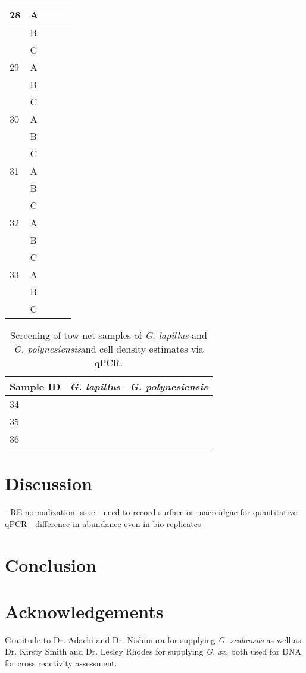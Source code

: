 \documentclass[12pt]{article}
\begin{document}
\begin{longtable}{ | p{1cm} | p{1cm} | p{3cm} | p{4cm} | p{4cm} | }
\hline
28&A&&&\\
\hline
&B&&&\\
\hline
&C&&&\\
\hline
29&A&&&\\
\hline
&B&&&\\
\hline
&C&&&\\
\hline
30&A&&&\\
\hline
&B&&&\\
\hline
&C&&&\\
\hline
31&A&&&\\
\hline
&B&&&\\
\hline
&C&&&\\
\hline
32&A&&&\\
\hline
&B&&&\\
\hline
&C&&&\\
\hline
33&A&&&\\
\hline
&B&&&\\
\hline
&C&&&\\
 \hline
\end{longtable}
\FloatBarrier

\FloatBarrier
\begin{table}
\caption{Screening of tow net samples of \emph{G. lapillus} and \emph{G. polynesiensis}and cell density estimates via qPCR.}
\label{tbl:NetTable}
\begin{tabular}{  | p{4cm} |  p{4cm} | p{4cm} | }
\hline
\textbf{Sample ID}  & \textbf{\emph{G. lapillus}} & \textbf{\emph{G. polynesiensis}}  \\
\hline
34 &&\\
\hline
35&&\\
\hline
36&&\\
\hline
 \end{tabular}
\end{table}
\FloatBarrier
\newpage
\section{Discussion}
- RE normalization issue
- need to record surface or macroalgae for quantitative qPCR
- difference in abundance even in bio replicates
\newpage
\section{Conclusion}

\section{Acknowledgements}
Gratitude to Dr. Adachi and Dr. Nishimura for supplying \emph{G. scabrosus} as well as Dr. Kirsty Smith and Dr. Lesley Rhodes for supplying \emph{G. xx}, both used for DNA for cross reactivity assessment.
\FloatBarrier
\newpage


\end{document}
